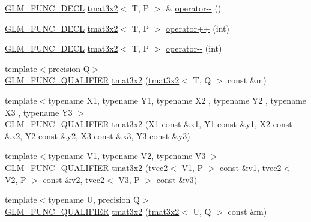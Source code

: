\begin{DoxyCompactItemize}
\item 
\hyperlink{setup_8hpp_ab2d052de21a70539923e9bcbf6e83a51}{G\+L\+M\+\_\+\+F\+U\+N\+C\+\_\+\+D\+E\+CL} \hyperlink{structglm_1_1detail_1_1tmat3x2}{tmat3x2}$<$ T, P $>$ \& \hyperlink{structglm_1_1detail_1_1tmat3x2_aee4f32e3b1bd8b4e9def345a530b3499}{operator-\/-\/} ()
\item 
\hyperlink{setup_8hpp_ab2d052de21a70539923e9bcbf6e83a51}{G\+L\+M\+\_\+\+F\+U\+N\+C\+\_\+\+D\+E\+CL} \hyperlink{structglm_1_1detail_1_1tmat3x2}{tmat3x2}$<$ T, P $>$ \hyperlink{structglm_1_1detail_1_1tmat3x2_a33e503443ab8dea023c343c0c5b9a91c}{operator++} (int)
\item 
\hyperlink{setup_8hpp_ab2d052de21a70539923e9bcbf6e83a51}{G\+L\+M\+\_\+\+F\+U\+N\+C\+\_\+\+D\+E\+CL} \hyperlink{structglm_1_1detail_1_1tmat3x2}{tmat3x2}$<$ T, P $>$ \hyperlink{structglm_1_1detail_1_1tmat3x2_a3547cfdefa716317277db523703debee}{operator-\/-\/} (int)
\item 
{\footnotesize template$<$precision Q$>$ }\\\hyperlink{setup_8hpp_a33fdea6f91c5f834105f7415e2a64407}{G\+L\+M\+\_\+\+F\+U\+N\+C\+\_\+\+Q\+U\+A\+L\+I\+F\+I\+ER} \hyperlink{structglm_1_1detail_1_1tmat3x2_a5b0141e3e353259aed227c013a5ae5a0}{tmat3x2} (\hyperlink{structglm_1_1detail_1_1tmat3x2}{tmat3x2}$<$ T, Q $>$ const \&m)
\item 
{\footnotesize template$<$typename X1, typename Y1, typename X2 , typename Y2 , typename X3 , typename Y3 $>$ }\\\hyperlink{setup_8hpp_a33fdea6f91c5f834105f7415e2a64407}{G\+L\+M\+\_\+\+F\+U\+N\+C\+\_\+\+Q\+U\+A\+L\+I\+F\+I\+ER} \hyperlink{structglm_1_1detail_1_1tmat3x2_ae3a805c23b230b65cc49d3a3d7ca027a}{tmat3x2} (X1 const \&x1, Y1 const \&y1, X2 const \&x2, Y2 const \&y2, X3 const \&x3, Y3 const \&y3)
\item 
{\footnotesize template$<$typename V1, typename V2, typename V3 $>$ }\\\hyperlink{setup_8hpp_a33fdea6f91c5f834105f7415e2a64407}{G\+L\+M\+\_\+\+F\+U\+N\+C\+\_\+\+Q\+U\+A\+L\+I\+F\+I\+ER} \hyperlink{structglm_1_1detail_1_1tmat3x2_a701537988a37657db53fd40d9b68d364}{tmat3x2} (\hyperlink{structglm_1_1detail_1_1tvec2}{tvec2}$<$ V1, P $>$ const \&v1, \hyperlink{structglm_1_1detail_1_1tvec2}{tvec2}$<$ V2, P $>$ const \&v2, \hyperlink{structglm_1_1detail_1_1tvec2}{tvec2}$<$ V3, P $>$ const \&v3)
\item 
{\footnotesize template$<$typename U, precision Q$>$ }\\\hyperlink{setup_8hpp_a33fdea6f91c5f834105f7415e2a64407}{G\+L\+M\+\_\+\+F\+U\+N\+C\+\_\+\+Q\+U\+A\+L\+I\+F\+I\+ER} \hyperlink{structglm_1_1detail_1_1tmat3x2_a81e00e89a4ebf83f1b74bbbc79f5f795}{tmat3x2} (\hyperlink{structglm_1_1detail_1_1tmat3x2}{tmat3x2}$<$ U, Q $>$ const \&m)

\end{DoxyCompactItemize}
